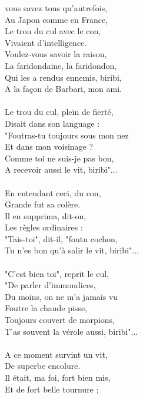 
 vous savez tous qu’autrefois,
\\Au Japon comme en France,
\\Le trou du cul avec le con,
\\Vivaient d’intelligence.
\\Voulez-vous savoir la raison,
\\La faridondaine, la faridondon,
\\Qui les a rendus ennemis, biribi,
\\A la façon de Barbari, mon ami.
\\\\Le trou du cul, plein de fierté,
\\Disait dans son language :
\\"Foutras-tu toujours sous mon nez
\\Et dans mon voisinage ?
\\Comme toi ne suis-je pas bon,
\\A recevoir aussi le vit, biribi"...
\\\\En entendant ceci, du con,
\\Grande fut sa colère.
\\Il en supprima, dit-on,
\\Les règles ordinaires :
\\"Tais-toi", dit-il, "foutu cochon,
\\Tu n’es bon qu’à salir le vit, biribi"...
\\\\"C’est bien toi", reprit le cul,
\\"De parler d’immondices,
\\Du moins, on ne m’a jamais vu
\\Foutre la chaude pisse,
\\Toujours couvert de morpions,
\\T’as souvent la vérole aussi, biribi"...
\\\\A ce moment survint un vit,
\\De superbe encolure.
\\Il était, ma foi, fort bien mis,
\\Et de fort belle tournure ;
